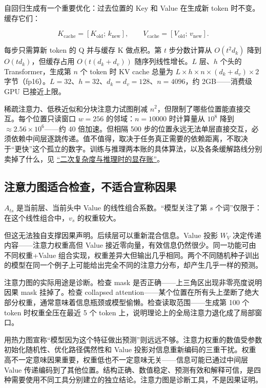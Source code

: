 自回归生成有一个重要优化：过去位置的 Key 和 Value 在生成新 token 时不变。缓存它们：

\[
K_{\text{cache}} = [K_{\text{old}};\,k_{\text{new}}],\qquad
V_{\text{cache}} = [V_{\text{old}};\,v_{\text{new}}].
\]

每步只需算新 token 的 Q 并与缓存 K 做点积。第 \(t\) 步分数计算从 \(O(t^2 d_k)\) 降到 \(O(t d_k)\)，但缓存占用 \(O(t(d_k+d_v))\) 随序列线性增长。\(L\) 层、\(h\) 个头的 Transformer，生成第 \(n\) 个 token 时 KV cache 总量为 \(L\times h\times n\times (d_k+d_v)\times 2\) 字节（fp16）。\(L=32\)、\(h=32\)、\(d_k=d_v=128\)、\(n=4096\)，约 2GB——消费级 GPU 已接近上限。

稀疏注意力、低秩近似和分块注意力试图削减 \(n^2\)，但限制了哪些位置能直接交互。每个位置只读窗口 \(w=256\) 的邻域：\(n=10000\) 时计算量从 \(10^8\) 降到 \(\approx 2.56\times 10^6\)——约 40 倍加速。但相隔 500 步的位置永远无法单层直接交互，必须依赖中间层逐跳传递。值不值得，取决于任务真正需要的依赖距离，不取决于``更快''这个孤立的数字。训练与推理两本账的具体算法，以及各条缓解路线分别卖掉了什么，见 \hyperref[sec:14-Deep-Learning/05-Attention-and-Sequence-Models/05]{``二次复杂度与推理时的显存账''}。

\subsection{注意力图适合检查，不适合宣称因果}

\(A_{ts}\) 是当前层、当前头中 Value 的线性组合系数。``模型关注了第 \(s\) 个词''仅限于：在这个线性组合中，\(v_s\) 的权重较大。

但这无法独自支撑因果声明。后续层可以重新混合信息。Value 投影 \(W_V\) 决定传递内容——注意力权重高但 Value 接近零向量，有效信息仍然很少。同一功能可由不同权重+Value 组合实现，权重差异大但输出几乎相同。两个不同随机种子训出的模型在同一个例子上可能给出完全不同的注意力分布，却产生几乎一样的预测。

注意力图的实际用途是诊断。检查 mask 是否正确——上三角区出现非零亮度说明因果 mask 挂掉了。检查 collapsed attention——某个位置在所有头上垄断了绝大部分权重，通常意味着信息瓶颈或模型偷懒。检查读取范围——生成第 100 个 token 时权重全压在最近 5 个 token 上，说明理论上的全局注意力退化成了局部窗口。

用热力图宣称``模型因为这个特征做出预测''则远远不够。注意力权重的数值受参数初始化随机性、优化路径偶然性和 Value 投影对信息重新编码的三重干扰。权重高不一定意味因果重要，权重低也不一定意味无关——信息可能已通过中间层 Value 传递编码到了其他位置。结构正确、数值稳定、预测有效和解释可信，是四种需要使用不同工具分别建立的独立结论。注意力图是诊断工具，不是因果证明。
